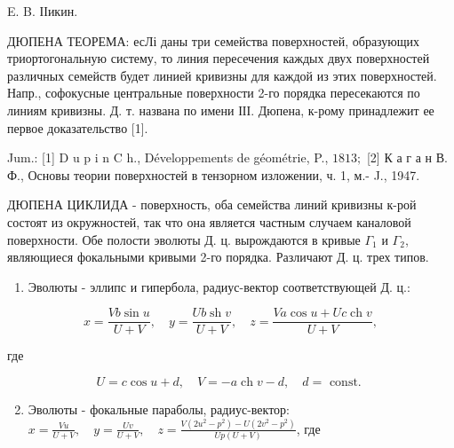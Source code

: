\documentclass[10pt]{article}
\begin{document}
E. B. ІІикин.



ДЮПЕНА ТЕОРЕМА: есЛі даны три семейства поверхностей, образующих триортогональную систему, то линия пересечения каждых двух поверхностей различных семейств будет линией кривизны для каждой из этих поверхностей. Напр., софокусные центральные поверхности 2-го порядка пересекаются по линиям кривизны. Д. т. названа по имени ІІІ. Дюпена, к-рому принадлежит ее первое доказательство [1].



Jum.: [1] D u p i n C h., Développements de géométrie, P., $1813 ;$ [2] К а г а н В. Ф., Основы теории поверхностей в тензорном изложении, ч. 1, м.- J., 1947.



ДЮПЕНА ЦИКЛИДА - поверхность, оба семейства линий кривизны к-рой состоят из окружностей, так что она является частным случаем каналовой поверхности. Обе полости эволюты Д. ц. вырождаются в кривые $\Gamma_{1}$ и $\Gamma_{2}$, являющиеся фокальными кривыми 2-го порядка. Различают Д. ц. трех типов.



\begin{enumerate}

  \item Эволюты - эллипс и гипербола, радиус-вектор соответствующей Д. ц.:

\end{enumerate}



\[

x=\frac{V b \sin u}{U+V}, \quad y=\frac{U b \operatorname{sh} v}{U+V}, \quad z=\frac{V a \cos u+U c \operatorname{ch} v}{U+V},

\]



где



\[

U=c \cos u+d, \quad V=-a \operatorname{ch} v-d, \quad d=\text { const. }

\]



\begin{enumerate}

  \setcounter{enumi}{1}

  \item Эволюты - фокальные параболы, радиус-вектор: $x=\frac{V u}{U+V}, \quad y=\frac{U v}{U+V}, \quad z=\frac{V\left(2 u^{2}-p^{2}\right)-U\left(2 v^{2}-p^{2}\right)}{U p(U+V)}$, где

\end{enumerate}
\end{document}
